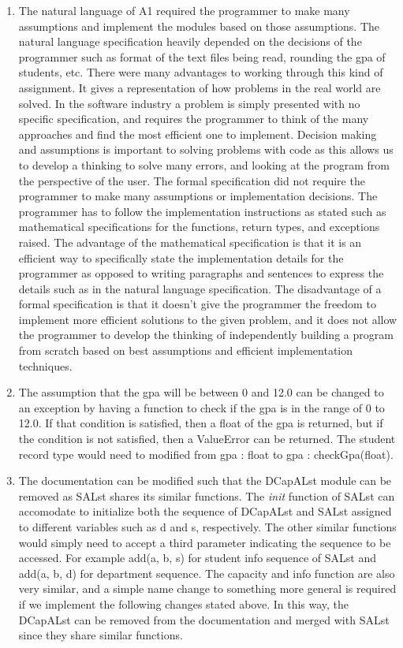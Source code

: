 \documentclass[12pt]{article}
\begin{document}
\begin{enumerate}

\item The natural language of A1 required the programmer to make many assumptions and implement the modules based on those assumptions. The natural language specification
heavily depended on the decisions of the programmer such as format of the text files being read, rounding the gpa of students, etc. There were many advantages to working through this kind of assignment. It gives a representation of how problems in the real world
are solved. In the software industry a problem is simply presented with no specific specification, and requires the programmer to think of the many
approaches and find the most efficient one to implement. Decision making and assumptions is important to solving problems with code as this allows 
us to develop a thinking to solve many errors, and looking at the program from the perspective of the user. The formal specification did not require the programmer to make
many assumptions or implementation decisions. The programmer has to follow the implementation instructions as stated such as mathematical specifications for the functions,
return types, and exceptions raised. The advantage of the mathematical specification is that it is an efficient way to specifically state the implementation details for the programmer as 
opposed to writing paragraphs and sentences to express the details such as in the natural language specification. The disadvantage of a formal specification is that it doesn't give the programmer
the freedom to implement more efficient solutions to the given problem, and it does not allow the programmer to develop the thinking of independently building a program from scratch based on best
assumptions and efficient implementation techniques. 

\item The assumption that the gpa will be between 0 and 12.0 can be changed to an exception by having a function to check if the gpa is in the range of 0 to 12.0. If that condition is satisfied, then
a float of the gpa is returned, but if the condition is not satisfied, then a ValueError can be returned. The student record type would need to modified from gpa : float to gpa : checkGpa(float). 

\item The documentation can be modified such that the DCapALst module can be removed as SALst shares its similar functions. The \textit{init} function of SALst can accomodate 
to initialize both the sequence of DCapALst and SALst assigned to different variables such as d and s, respectively. The other similar functions would simply need to accept a third
parameter indicating the sequence to be accessed. For example add(a, b, s) for student info sequence of SALst and add(a, b, d) for department sequence. The capacity and info function
are also very similar, and a simple name change to something more general is required if we implement the following changes stated above. In this way, the DCapALst can be removed from the documentation
and merged with SALst since they share similar functions.


\end{enumerate}
\end{document}

